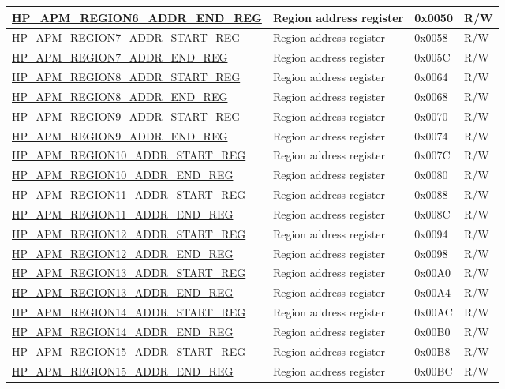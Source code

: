 \begin{longtable}{ | L{6.5cm} | L{6.5cm} | l | l| }
\hyperref[regdesc:HPAPMREGIONNADDRENDREG]{HP\_APM\_REGION6\_ADDR\_END\_REG} & Region address register & 0x0050 & R/W \\ \hline
\hyperref[regdesc:HPAPMREGIONNADDRSTARTREG]{HP\_APM\_REGION7\_ADDR\_START\_REG} & Region address register & 0x0058 & R/W \\ \hline
\hyperref[regdesc:HPAPMREGIONNADDRENDREG]{HP\_APM\_REGION7\_ADDR\_END\_REG} & Region address register & 0x005C & R/W \\ \hline
\hyperref[regdesc:HPAPMREGIONNADDRSTARTREG]{HP\_APM\_REGION8\_ADDR\_START\_REG} & Region address register & 0x0064 & R/W \\ \hline
\hyperref[regdesc:HPAPMREGIONNADDRENDREG]{HP\_APM\_REGION8\_ADDR\_END\_REG} & Region address register & 0x0068 & R/W \\ \hline
\hyperref[regdesc:HPAPMREGIONNADDRSTARTREG]{HP\_APM\_REGION9\_ADDR\_START\_REG} & Region address register & 0x0070 & R/W \\ \hline
\hyperref[regdesc:HPAPMREGIONNADDRENDREG]{HP\_APM\_REGION9\_ADDR\_END\_REG} & Region address register & 0x0074 & R/W \\ \hline
\hyperref[regdesc:HPAPMREGIONNADDRSTARTREG]{HP\_APM\_REGION10\_ADDR\_START\_REG} & Region address register & 0x007C & R/W \\ \hline
\hyperref[regdesc:HPAPMREGIONNADDRENDREG]{HP\_APM\_REGION10\_ADDR\_END\_REG} & Region address register & 0x0080 & R/W \\ \hline
\hyperref[regdesc:HPAPMREGIONNADDRSTARTREG]{HP\_APM\_REGION11\_ADDR\_START\_REG} & Region address register & 0x0088 & R/W \\ \hline
\hyperref[regdesc:HPAPMREGIONNADDRENDREG]{HP\_APM\_REGION11\_ADDR\_END\_REG} & Region address register & 0x008C & R/W \\ \hline
\hyperref[regdesc:HPAPMREGIONNADDRSTARTREG]{HP\_APM\_REGION12\_ADDR\_START\_REG} & Region address register & 0x0094 & R/W \\ \hline
\hyperref[regdesc:HPAPMREGIONNADDRENDREG]{HP\_APM\_REGION12\_ADDR\_END\_REG} & Region address register & 0x0098 & R/W \\ \hline
\hyperref[regdesc:HPAPMREGIONNADDRSTARTREG]{HP\_APM\_REGION13\_ADDR\_START\_REG} & Region address register & 0x00A0 & R/W \\ \hline
\hyperref[regdesc:HPAPMREGIONNADDRENDREG]{HP\_APM\_REGION13\_ADDR\_END\_REG} & Region address register & 0x00A4 & R/W \\ \hline
\hyperref[regdesc:HPAPMREGIONNADDRSTARTREG]{HP\_APM\_REGION14\_ADDR\_START\_REG} & Region address register & 0x00AC & R/W \\ \hline
\hyperref[regdesc:HPAPMREGIONNADDRENDREG]{HP\_APM\_REGION14\_ADDR\_END\_REG} & Region address register & 0x00B0 & R/W \\ \hline
\hyperref[regdesc:HPAPMREGIONNADDRSTARTREG]{HP\_APM\_REGION15\_ADDR\_START\_REG} & Region address register & 0x00B8 & R/W \\ \hline
\hyperref[regdesc:HPAPMREGIONNADDRENDREG]{HP\_APM\_REGION15\_ADDR\_END\_REG} & Region address register & 0x00BC & R/W \\ \hline


\end{longtable}
